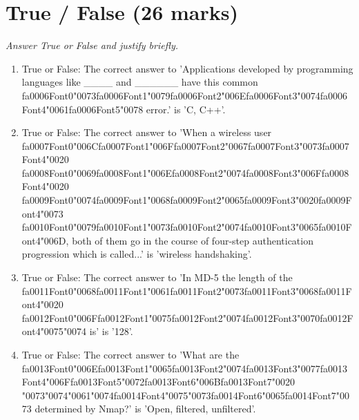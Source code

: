 \documentclass[12pt]{article}
\begin{document}
\section*{True / False (26 marks)}
\textit{Answer True or False and justify briefly.}
\begin{enumerate}[label=\arabic*.]
\item True or False: The correct answer to 'Applications developed by programming languages like \_\_\_\_ and \_\_\_\_\_\_ have this common {\csname fa0006Font0\endcsname\char"0073}{\csname fa0006Font1\endcsname\char"0079}{\csname fa0006Font2\endcsname\char"006E}{\csname fa0006Font3\endcsname\char"0074}{\csname fa0006Font4\endcsname\char"0061}{\csname fa0006Font5\endcsname\char"0078} error.' is 'C, C++'.
\item True or False: The correct answer to 'When a wireless user {\csname fa0007Font0\endcsname\char"006C}{\csname fa0007Font1\endcsname\char"006F}{\csname fa0007Font2\endcsname\char"0067}{\csname fa0007Font3\endcsname\char"0073}{\csname fa0007Font4\endcsname\char"0020} {\csname fa0008Font0\endcsname\char"0069}{\csname fa0008Font1\endcsname\char"006E}{\csname fa0008Font2\endcsname\char"0074}{\csname fa0008Font3\endcsname\char"006F}{\csname fa0008Font4\endcsname\char"0020} {\csname fa0009Font0\endcsname\char"0074}{\csname fa0009Font1\endcsname\char"0068}{\csname fa0009Font2\endcsname\char"0065}{\csname fa0009Font3\endcsname\char"0020}{\csname fa0009Font4\endcsname\char"0073} {\csname fa0010Font0\endcsname\char"0079}{\csname fa0010Font1\endcsname\char"0073}{\csname fa0010Font2\endcsname\char"0074}{\csname fa0010Font3\endcsname\char"0065}{\csname fa0010Font4\endcsname\char"006D}, both of them go in the course of four-step authentication progression which is called...' is 'wireless handshaking'.
\item True or False: The correct answer to 'In MD-5 the length of the {\csname fa0011Font0\endcsname\char"0068}{\csname fa0011Font1\endcsname\char"0061}{\csname fa0011Font2\endcsname\char"0073}{\csname fa0011Font3\endcsname\char"0068}{\csname fa0011Font4\endcsname\char"0020} {\csname fa0012Font0\endcsname\char"006F}{\csname fa0012Font1\endcsname\char"0075}{\csname fa0012Font2\endcsname\char"0074}{\csname fa0012Font3\endcsname\char"0070}{\csname fa0012Font4\endcsname\char"0075}{\char"0074} is' is '128'.
\item True or False: The correct answer to 'What are the {\csname fa0013Font0\endcsname\char"006E}{\csname fa0013Font1\endcsname\char"0065}{\csname fa0013Font2\endcsname\char"0074}{\csname fa0013Font3\endcsname\char"0077}{\csname fa0013Font4\endcsname\char"006F}{\csname fa0013Font5\endcsname\char"0072}{\csname fa0013Font6\endcsname\char"006B}{\csname fa0013Font7\endcsname\char"0020} {\char"0073}{\char"0074}{\char"0061}{\char"0074}{\csname fa0014Font4\endcsname\char"0075}{\char"0073}{\csname fa0014Font6\endcsname\char"0065}{\csname fa0014Font7\endcsname\char"0073} determined by Nmap?' is 'Open, filtered, unfiltered'.

\end{enumerate}
\end{document}
